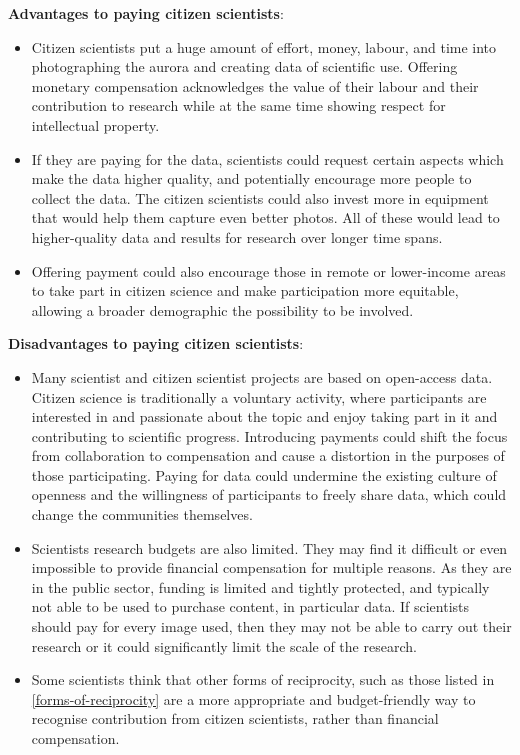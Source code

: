\documentclass{article}
\begin{document}
\textbf{Advantages to paying citizen scientists}:
\begin{itemize}
    \item Citizen scientists put a huge amount of effort, money, labour, and time into photographing the aurora and creating data of scientific use. Offering monetary compensation acknowledges the value of their labour and their contribution to research while at the same time showing respect for intellectual property.
    \item If they are paying for the data, scientists could request certain aspects which make the data higher quality, and potentially encourage more people to collect the data. The citizen scientists could also invest more in equipment that would help them capture even better photos. All of these would lead to higher-quality data and results for research over longer time spans.
    \item Offering payment could also encourage those in remote or lower-income areas to take part in citizen science and make participation more equitable, allowing a broader demographic the possibility to be involved.
\end{itemize}

\textbf{Disadvantages to paying citizen scientists}:
\begin{itemize}
    \item Many scientist and citizen scientist projects are based on open-access data. Citizen science is traditionally a voluntary activity, where participants are interested in and passionate about the topic and enjoy taking part in it and contributing to scientific progress. Introducing payments could shift the focus from collaboration to compensation and cause a distortion in the purposes of those participating. Paying for data could undermine the existing culture of openness and the willingness of participants to freely share data, which could change the communities themselves.
    \item Scientists research budgets are also limited. They may find it difficult or even impossible to provide financial compensation for multiple reasons. As they are in the public sector, funding is limited and tightly protected, and typically not able to be used to purchase content, in particular data. If scientists should pay for every image used, then they may not be able to carry out their research or it could significantly limit the scale of the research.
    \item Some scientists think that other forms of reciprocity, such as those listed in \ref{forms-of-reciprocity} are a more appropriate and budget-friendly way to recognise contribution from citizen scientists, rather than financial compensation.
\end{itemize}
\end{document}
